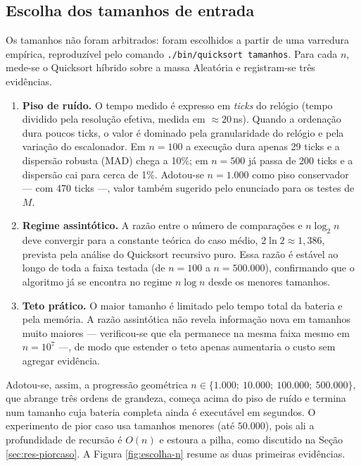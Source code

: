 \subsection{Escolha dos tamanhos de entrada}
\label{sec:escolha-n}

Os tamanhos não foram arbitrados: foram escolhidos a partir de uma varredura
empírica, reproduzível pelo comando \texttt{./bin/quicksort tamanhos}. Para cada
$n$, mede-se o Quicksort híbrido sobre a massa Aleatória e registram-se três
evidências.

\begin{enumerate}
  \item \textbf{Piso de ruído.} O tempo medido é expresso em \emph{ticks} do
        relógio (tempo dividido pela resolução efetiva, medida em
        $\approx 20$\,ns). Quando a ordenação dura poucos ticks, o valor é
        dominado pela granularidade do relógio e pela variação do escalonador.
        Em $n = 100$ a execução dura apenas 29 ticks e a dispersão robusta (MAD)
        chega a 10\%; em $n = 500$ já passa de 200 ticks e a dispersão cai para
        cerca de 1\%. Adotou-se $n = 1.000$ como piso conservador --- com 470
        ticks ---, valor também sugerido pelo enunciado para os testes de $M$.

  \item \textbf{Regime assintótico.} A razão entre o número de comparações e
        $n\log_2 n$ deve convergir para a constante teórica do caso médio,
        $2\ln 2 \approx 1{,}386$, prevista pela análise do Quicksort recursivo
        puro. Essa razão é estável ao longo de toda a faixa testada (de $n = 100$
        a $n = 500.000$), confirmando que o algoritmo já se encontra no regime
        $n\log n$ desde os menores tamanhos.

  \item \textbf{Teto prático.} O maior tamanho é limitado pelo tempo total da
        bateria e pela memória. A razão assintótica não revela informação nova em
        tamanhos muito maiores --- verificou-se que ela permanece na mesma faixa
        mesmo em $n = 10^7$ ---, de modo que estender o teto apenas aumentaria o
        custo sem agregar evidência.
\end{enumerate}

Adotou-se, assim, a progressão geométrica $n \in \{1.000;\ 10.000;\ 100.000;\
500.000\}$, que abrange três ordens de grandeza, começa acima do piso de ruído e
termina num tamanho cuja bateria completa ainda é executável em segundos. O
experimento de pior caso usa tamanhos menores (até $50.000$), pois ali a
profundidade de recursão é $O(n)$ e estoura a pilha, como discutido na Seção
\ref{sec:res-piorcaso}. A Figura \ref{fig:escolha-n} resume as duas primeiras
evidências.

